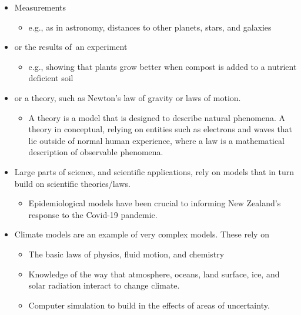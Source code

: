 \documentclass[
  10ptls,
  b5paper]{book}
\providecommand{\tightlist}{%
  \setlength{\itemsep}{0pt}\setlength{\parskip}{0pt}}
\begin{document}
\begin{itemize}
\tightlist
\item
  Measurements

  \begin{itemize}
  \tightlist
  \item
    e.g., as in astronomy, distances to other planets,
    stars, and galaxies
  \end{itemize}
\item
  or the results of~an experiment

  \begin{itemize}
  \tightlist
  \item
    e.g., showing that plants grow better when compost is
    added to a nutrient deficient soil
  \end{itemize}
\item
  or a theory, such as Newton's law of gravity or laws of motion.

  \begin{itemize}
  \tightlist
  \item
    A theory is a model that is designed to describe natural
    phenomena. A theory in conceptual, relying on entities
    such as electrons and waves that lie outside of normal
    human experience, where a law is a mathematical description
    of observable phenomena.
  \end{itemize}
\item
  Large parts of science, and scientific applications, rely on
  models that in turn build on scientific theories/laws.

  \begin{itemize}
  \tightlist
  \item
    Epidemiological models have been crucial to informing
    New Zealand's response to the Covid-19 pandemic.
  \end{itemize}
\item
  Climate models are an example of very complex models. These
  rely on

  \begin{itemize}
  \tightlist
  \item
    The basic laws of physics, fluid motion, and chemistry
  \item
    Knowledge of the way that atmosphere, oceans, land
    surface, ice, and solar radiation interact to change
    climate.
  \item
    Computer simulation to build in the effects of areas
    of uncertainty.
  \end{itemize}
\end{itemize}
\end{document}
